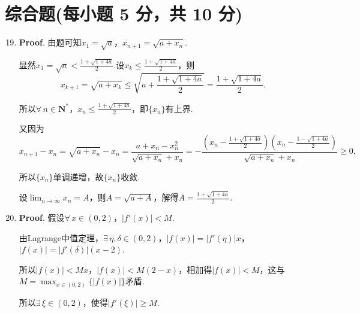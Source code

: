 \documentclass[../Main.tex]{subfiles}
\begin{document}
\section{综合题(每小题 5 分，共 10 分)}
\begin{enumerate}
    \setcounter{enumi}{18}
    \item \textbf{Proof}. 由题可知$x_{1}=\sqrt{a}$，$x_{n+1}=\sqrt{a+x_{n}}$.

          显然$x_{1}=\sqrt{a}<\frac{1+\sqrt{1+4a}}{2}$.设$x_{k}\leq\frac{1+\sqrt{1+4a}}{2}$，则
          \[
              x_{k+1}=\sqrt{a+x_{k}}\leq\sqrt{a+\frac{1+\sqrt{1+4a}}{2}}=\frac{1+\sqrt{1+4a}}{2}
              .
          \]

          所以$\forall\,n\in\mathbf{N}^{*}$，$x_{n}\leq\frac{1+\sqrt{1+4a}}{2}$，即$\{
              x_{n}\}$有上界.

          又因为
          \[
              x_{n+1}-x_{n}=\sqrt{a+x_{n}}-x_{n}=\frac{a+x_{n}-x_{n}^{2}}{\sqrt{a+x_n}+x_{n}}
              =-\frac{(x_{n}-\frac{1+\sqrt{1+4a}}{2})(x_{n}-\frac{1-\sqrt{1+4a}}{2})}{\sqrt{a+x_n}+x_{n}}
              \geq0,
          \]

          所以$\{x_{n}\}$单调递增，故$\{x_{n}\}$收敛.

          设$\lim_{n\to\infty}x_{n}=A$，则$A=\sqrt{a+A}$，解得$A=\frac{1+\sqrt{1+4a}}{2}$.

    \item \textbf{Proof}. 假设$\forall\,x\in(0,2)$，$|f'(x)|<M$.

          由Lagrange中值定理，$\exists\,\eta,\delta\in\left(0,2\right)$，$|f(x)|=|f'(
              \eta)|x$，$|f(x)|=|f'(\delta)|(x-2)$.

          所以$|f(x)|<Mx$，$|f(x)|<M(2-x)$，相加得$|f(x)|<M$，这与$M=\max_{x\in(0,2)}
              \{|f(x)|\}$矛盾.

          所以$\exists\,\xi\in(0,2)$，使得$|f'(\xi)|\geq M$.
\end{enumerate}
\end{document}
